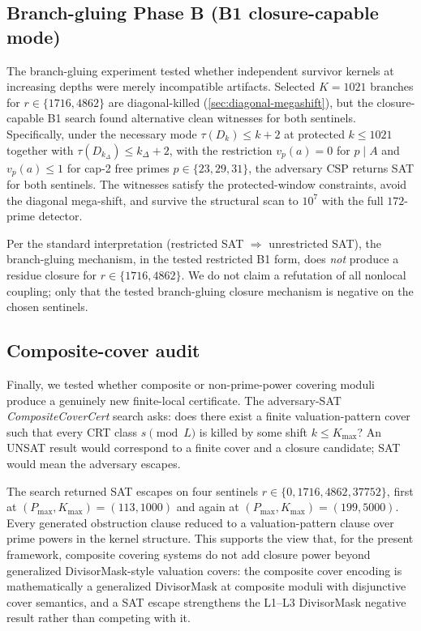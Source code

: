 \subsection{Branch-gluing Phase B (B1 closure-capable mode)}
\label{sec:branch-gluing-phaseB}

The branch-gluing experiment tested whether independent survivor
kernels at increasing depths were merely incompatible artifacts.
Selected $K = 1021$ branches for $r \in \{1716, 4862\}$ are
diagonal-killed (\cref{sec:diagonal-megashift}), but the
closure-capable B1 search found alternative clean witnesses for
both sentinels. Specifically, under the necessary mode
$\tau(D_k) \le k + 2$ at protected $k \le 1021$ together with
$\tau(D_{k_\Delta}) \le k_\Delta + 2$, with the restriction
$v_p(a) = 0$ for $p \mid A$ and $v_p(a) \le 1$ for cap-2 free primes
$p \in \{23, 29, 31\}$, the adversary CSP returns SAT for both
sentinels. The witnesses satisfy the protected-window constraints,
avoid the diagonal mega-shift, and survive the structural scan to
$10^7$ with the full $172$-prime detector.

Per the standard interpretation (restricted SAT $\Rightarrow$
unrestricted SAT), the branch-gluing mechanism, in the tested
restricted B1 form, does \emph{not} produce a residue closure for
$r \in \{1716, 4862\}$. We do not claim a refutation of all nonlocal
coupling; only that the tested branch-gluing closure mechanism is
negative on the chosen sentinels.

\subsection{Composite-cover audit}
\label{sec:composite-cover}

Finally, we tested whether composite or non-prime-power covering
moduli produce a genuinely new finite-local certificate. The
adversary-SAT \emph{CompositeCoverCert} search asks: does there
exist a finite valuation-pattern cover such that every CRT class
$s \pmod{L}$ is killed by some shift $k \le K_{\max}$? An UNSAT
result would correspond to a finite cover and a closure candidate;
SAT would mean the adversary escapes.

The search returned SAT escapes on four sentinels
$r \in \{0, 1716, 4862, 37752\}$, first at
$(P_{\max}, K_{\max}) = (113, 1000)$ and again at
$(P_{\max}, K_{\max}) = (199, 5000)$. Every generated obstruction
clause reduced to a valuation-pattern clause over prime powers in
the kernel structure. This supports the view that, for the present
framework, composite covering systems do not add closure power
beyond generalized DivisorMask-style valuation covers: the composite
cover encoding is mathematically a generalized DivisorMask at
composite moduli with disjunctive cover semantics, and a SAT escape
strengthens the L1--L3 DivisorMask negative result rather than
competing with it.


